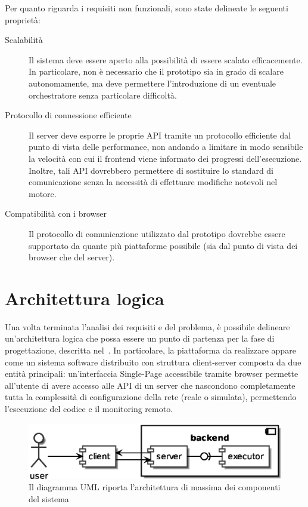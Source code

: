       Per quanto riguarda i requisiti non funzionali, sono state delineate le seguenti proprietà:

      \begin{description}
        \item[Scalabilità]
          Il sistema deve essere aperto alla possibilità di essere scalato efficacemente.
          In particolare, non è necessario che il prototipo sia in grado di scalare autonomamente, ma deve permettere l'introduzione di un eventuale orchestratore senza particolare difficoltà.

        \item[Protocollo di connessione efficiente]
          Il server deve esporre le proprie API tramite un protocollo efficiente dal punto di vista delle performance, non andando a limitare in modo sensibile la velocità con cui il frontend viene informato dei progressi dell'esecuzione.
          Inoltre, tali API dovrebbero permettere di sostituire lo standard di comunicazione senza la necessità di effettuare modifiche notevoli nel motore.

        \item[Compatibilità con i browser]
          Il protocollo di comunicazione utilizzato dal prototipo dovrebbe essere supportato da quante più piattaforme possibile (sia dal punto di vista dei browser che del server).
      \end{description}

  \section{Architettura logica}\label{sec:arch-logica}

  Una volta terminata l'analisi dei requisiti e del problema, è possibile delineare un'architettura logica che possa essere un punto di partenza per la fase di progettazione, descritta nel~.
  In particolare, la piattaforma da realizzare appare come un sistema software distribuito con struttura client-server composta da due entità principali:
  un'interfaccia Single-Page accessibile tramite browser permette all'utente di avere accesso alle API di un server che nascondono completamente tutta la complessità di configurazione della rete (reale o simulata), permettendo l'esecuzione del codice e il monitoring remoto.

  \begin{figure}[htbp]
    \centering
    \includegraphics[width=.8\textwidth]{res/uml/architecture-design.eps}%
    \caption{Il diagramma UML riporta l'architettura di massima dei componenti del sistema}%
    \label{fig:architecture-design}
  \end{figure}
